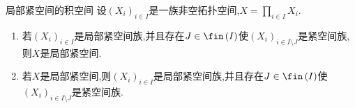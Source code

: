\begin{proposition}{局部紧空间的积空间}{}
	设$\left(X_{i}\right)_{i\in I}$是一族非空拓扑空间,$X=\prod\limits_{i\in I}X_{i}$.
	\begin{enumerate}
		\item 若$\left(X_{i}\right)_{i\in I}$是局部紧空间族,并且存在$J\in\fin\left(I\right)$使$\left(X_{i}\right)_{i\in I\setminus J}$是紧空间族,则$X$是局部紧空间.
		\item 若$X$是局部紧空间,则$\left(X_{i}\right)_{i\in I}$是局部紧空间族,并且存在$J\in\fin\left(I\right)$使$\left(X_{i}\right)_{i\in I\setminus J}$是紧空间族.
	\end{enumerate}
\end{proposition}